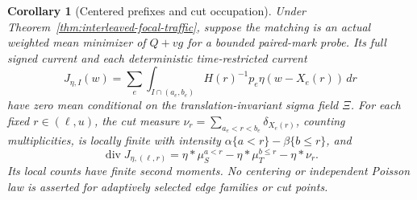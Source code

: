 \documentclass[11pt,reqno]{amsart}
\newtheorem{corollary}[theorem]{Corollary}
\theoremstyle{definition}
\theoremstyle{remark}
\numberwithin{equation}{section}
\begin{document}
\begin{corollary}[Centered prefixes and cut occupation]
\label{cor:interleaved-prefix-current}
Under Theorem~\ref{thm:interleaved-focal-traffic}, suppose the matching
is an actual weighted mean minimizer of \(Q+v g\) for a bounded
paired-mark probe. Its full signed current and each deterministic
time-restricted current
\[
 J_{\eta,I}(w)=\sum_e\int_{I\cap(a_e,b_e)}
 H(r)^{-1}p_e\eta(w-X_e(r))\,dr
\]
have zero mean conditional on the translation-invariant sigma field
\(\Xi\). For each fixed \(r\in(\ell,u)\), the cut measure
\(\nu_r=\sum_{a_e<r<b_e}\delta_{X_e(r)}\), counting multiplicities,
is locally finite with intensity
\(\alpha\{a<r\}-\beta\{b\le r\}\), and
\begin{equation}
\label{eq:interleaved-prefix-divergence}
 \operatorname{div}J_{\eta,(\ell,r)}
  =\eta*\mu_S^{a<r}-\eta*\mu_T^{b\le r}-\eta*\nu_r.
\end{equation}
Its local counts have finite second moments. No centering or independent
Poisson law is asserted for adaptively selected edge families or cut points.
\end{corollary}
\end{document}
